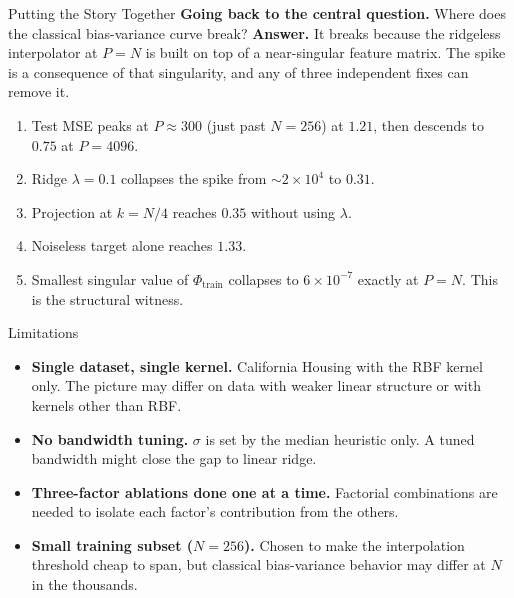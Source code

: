 \documentclass{beamer}
\begin{document}
\begin{frame}{Putting the Story Together}
\footnotesize
\textbf{Going back to the central question.} Where does the classical bias-variance curve break?
\vfill
\textbf{Answer.} It breaks because the ridgeless interpolator at $P = N$ is built on top of a near-singular feature matrix. The spike is a consequence of that singularity, and any of three independent fixes can remove it.
\vfill
\begin{enumerate}\setlength\itemsep{1pt}
\item Test MSE peaks at $P \approx 300$ (just past $N = 256$) at $1.21$, then descends to $0.75$ at $P = 4096$.
\item \textcolor{ridge}{Ridge $\lambda = 0.1$} collapses the spike from $\sim 2 \times 10^4$ to $0.31$.
\item \textcolor{proj}{Projection at $k = N/4$} reaches $0.35$ without using $\lambda$.
\item \textcolor{noise}{Noiseless target} alone reaches $1.33$.
\item Smallest singular value of $\Phi_{\text{train}}$ collapses to $6 \times 10^{-7}$ exactly at $P = N$. This is the structural witness.
\end{enumerate}
\end{frame}

\begin{frame}{Limitations}
\footnotesize
\begin{itemize}\setlength\itemsep{3pt}
\item \textbf{Single dataset, single kernel.} California Housing with the RBF kernel only. The picture may differ on data with weaker linear structure or with kernels other than RBF.
\item \textbf{No bandwidth tuning.} $\sigma$ is set by the median heuristic only. A tuned bandwidth might close the gap to linear ridge.
\item \textbf{Three-factor ablations done one at a time.} Factorial combinations are needed to isolate each factor's contribution from the others.
\item \textbf{Small training subset ($N = 256$).} Chosen to make the interpolation threshold cheap to span, but classical bias-variance behavior may differ at $N$ in the thousands.
\end{itemize}
\end{frame}
\end{document}
